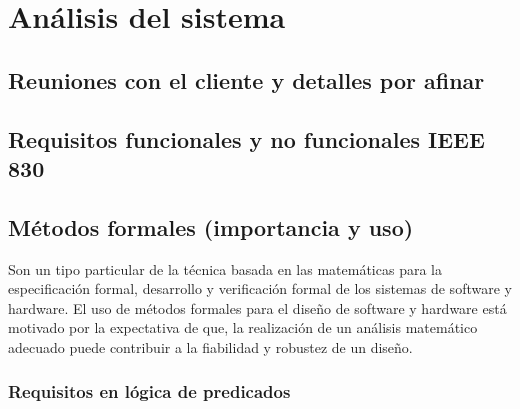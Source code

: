 \section{Análisis del sistema}

\subsection{Reuniones con el cliente y detalles por afinar}

\subsection{Requisitos funcionales y no funcionales IEEE 830}

\subsection{Métodos formales (importancia y uso)}
Son un tipo particular de la técnica basada en las matemáticas para la especificación formal, desarrollo y verificación formal de los sistemas de software y hardware. El uso de métodos formales para el diseño de software y hardware está motivado por la expectativa de que, la realización de un análisis matemático adecuado puede contribuir a la fiabilidad y robustez de un diseño. 

\subsubsection{Requisitos en lógica de predicados}


